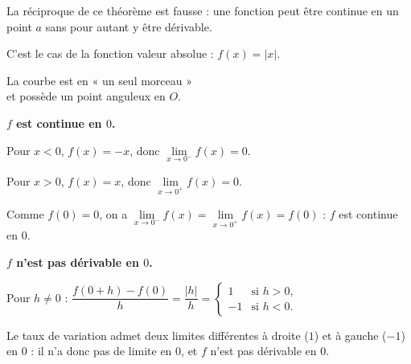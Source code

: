 \documentclass[11pt,a4paper]{article}
\newcommand{\limg}[2]{\lim\limits_{x\to #1^-}#2}
\newcommand{\limd}[2]{\lim\limits_{x\to #1^+}#2}
\begin{document}
\begin{minipage}[c]{0.6\linewidth}
La réciproque de ce théorème est fausse : une fonction peut être continue en un
point $a$ sans pour autant y être dérivable.

C'est le cas de la fonction valeur absolue : $f(x)=\lvert x\rvert$.
\end{minipage}\hfill
\begin{minipage}[c]{0.36\linewidth}
\centering
{}

{\small{} La courbe est en « un seul morceau » \\ et possède un point
anguleux en $O$.\par}
\end{minipage}

\begin{demo}
\textbf{$f$ est continue en $0$.}

Pour $x<0$, $f(x)=-x$, donc $\limg{0}{f(x)}=0$.

Pour $x>0$, $f(x)=x$, donc $\limd{0}{f(x)}=0$.

Comme $f(0)=0$, on a $\limg{0}{f(x)}=\limd{0}{f(x)}=f(0)$ : $f$ est continue en $0$.

\textbf{$f$ n'est pas dérivable en $0$.}

Pour $h\neq 0$ :
$\dfrac{f(0+h)-f(0)}{h}=\dfrac{\lvert h\rvert}{h}=
  \begin{cases} 1 & \text{si } h>0,\\ -1 & \text{si } h<0.\end{cases}$

Le taux de variation admet deux limites différentes à droite ($1$) et à gauche
($-1$) en $0$ : il n'a donc pas de limite en $0$, et $f$ n'est pas dérivable en $0$.
\end{demo}
\end{document}
